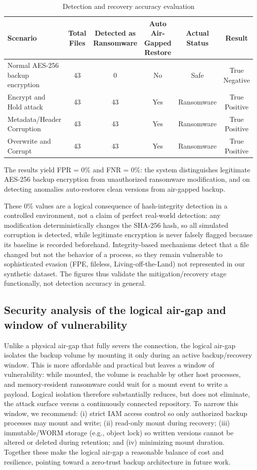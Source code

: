 \documentclass{iaesarticle}
\begin{document}
\begin{table}[htbp]
\centering
\fontsize{8pt}{10pt}\selectfont
\caption{Detection and recovery accuracy evaluation}
\label{tab:detection_accuracy}
\begin{tabularx}{\textwidth}{@{}X c c c c c@{}}
\hline
\textbf{Scenario} & \textbf{Total Files} & \textbf{Detected as Ransomware} & \textbf{Auto Air-Gapped Restore} & \textbf{Actual Status} & \textbf{Result} \\
\hline
Normal AES-256 backup encryption & 43 & 0 & No & Safe & True Negative \\
Encrypt and Hold attack & 43 & 43 & Yes & Ransomware & True Positive \\
Metadata/Header Corruption & 43 & 43 & Yes & Ransomware & True Positive \\
Overwrite and Corrupt & 43 & 43 & Yes & Ransomware & True Positive \\
\hline
\end{tabularx}
\end{table}

The results yield FPR = 0\% and FNR = 0\%: the system distinguishes legitimate AES-256 backup encryption from unauthorized ransomware modification, and on detecting anomalies auto-restores clean versions from air-gapped backup.

These 0\% values are a logical consequence of hash-integrity detection in a controlled environment, not a claim of perfect real-world detection: any modification deterministically changes the SHA-256 hash, so all simulated corruption is detected, while legitimate encryption is never falsely flagged because its baseline is recorded beforehand. Integrity-based mechanisms detect that a file changed but not the behavior of a process, so they remain vulnerable to sophisticated evasion (FPE, fileless, Living-off-the-Land) not represented in our synthetic dataset. The figures thus validate the mitigation/recovery stage functionally, not detection accuracy in general.

\subsection{Security analysis of the logical air-gap and window of vulnerability}
Unlike a physical air-gap that fully severs the connection, the logical air-gap isolates the backup volume by mounting it only during an active backup/recovery window. This is more affordable and practical but leaves a window of vulnerability: while mounted, the volume is reachable by other host processes, and memory-resident ransomware could wait for a mount event to write a payload. Logical isolation therefore substantially reduces, but does not eliminate, the attack surface versus a continuously connected repository. To narrow this window, we recommend: (i) strict IAM access control so only authorized backup processes may mount and write; (ii) read-only mount during recovery; (iii) immutable/WORM storage (e.g., object lock) so written versions cannot be altered or deleted during retention; and (iv) minimizing mount duration. Together these make the logical air-gap a reasonable balance of cost and resilience, pointing toward a zero-trust backup architecture in future work.
\end{document}
